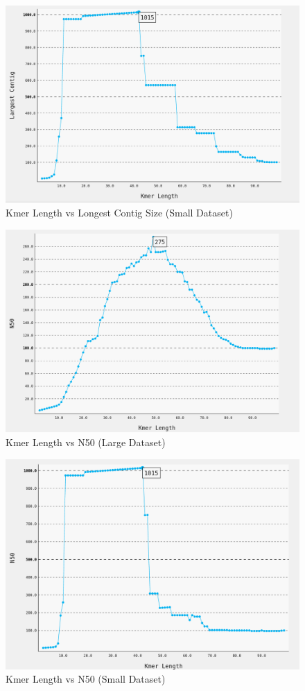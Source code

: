 \documentclass[12pt]{article}
\begin{document}
\begin{figure}[p]
\centering
\includegraphics[width=5.5in]{klen_vs_largestcontig_small_fasta.png}
\caption{Kmer Length vs Longest Contig Size (Small Dataset)}
\label{fig:kmer_to_contig_small}
\end{figure}

\begin{figure}[p]
\centering
\includegraphics[width=5.5in]{klen_vs_n50_large_fasta.png}
\caption{Kmer Length vs N50 (Large Dataset)}
\label{fig:kmer_to_n50_large}
\end{figure}

\begin{figure}[p]
\centering
\includegraphics[width=5.5in]{klen_vs_n50_small_fasta.png}
\caption{Kmer Length vs N50 (Small Dataset)}
\label{fig:kmer_to_n50_small}
\end{figure}
\end{document}
